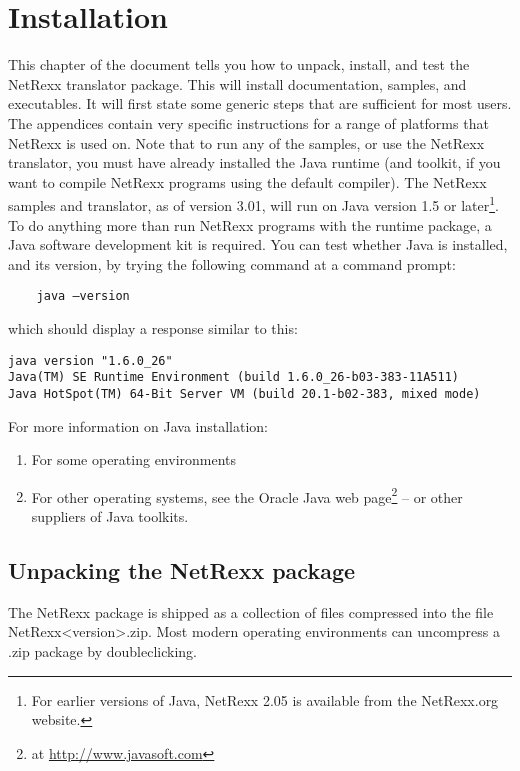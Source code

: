 \chapter{Installation}
This chapter of the document tells you how to unpack, install, and test the NetRexx translator package. This will install documentation, samples, and executables. It will first state some generic steps that are sufficient for most users. The appendices contain very specific instructions for a range of platforms that NetRexx is used on. 
Note that to run any of the samples, or use the NetRexx translator, you must have already installed the Java runtime (and toolkit, if you want to compile NetRexx programs using the default compiler). 
The NetRexx samples and translator, as of version 3.01, will run on 
Java version 1.5 or later\footnote{For earlier versions of Java, NetRexx 2.05 is available from the NetRexx.org website.}. To do anything more than run NetRexx programs with the runtime package, a Java software development kit is required. You can test whether Java is installed, and its version, by trying the following command at a command prompt:
\begin{verbatim} 
    java –version
\end{verbatim}
which should display a response similar to this:
\begin{verbatim} 
java version "1.6.0_26"
Java(TM) SE Runtime Environment (build 1.6.0_26-b03-383-11A511)
Java HotSpot(TM) 64-Bit Server VM (build 20.1-b02-383, mixed mode)
\end{verbatim}
For more information on Java installation:
\begin{enumerate} 
\item For some operating environments
\item For other operating systems, see the Oracle Java web page\footnote{at \url{http://www.javasoft.com}} – or other suppliers of Java toolkits.
\end{enumerate}
\section{Unpacking the NetRexx package}
The NetRexx package is shipped as a collection of files compressed into the file NetRexx<version>.zip. 
Most modern operating environments can uncompress a .zip package by doubleclicking.
